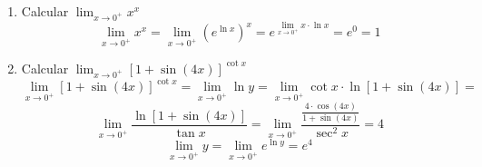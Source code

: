 \begin{enumerate}
	\item Calcular $\lim_{x\rightarrow0^{+}}x^x$
		$$\lim_{x\rightarrow0^+}x^x=\lim_{x\rightarrow0^{+}}(e^{\ln x})^x=e^{\lim_{x\rightarrow0^+}x\cdot\ln x}=e^0=1$$
	\item Calcular $\lim_{x\rightarrow0^{+}}[1+\sin(4x)]^{\cot x}$
		$$\lim_{x\rightarrow0^+}[1+\sin(4x)]^{\cot x}=\lim_{x\rightarrow0^+}\ln y=\lim_{x\rightarrow0^+}\cot x\cdot\ln [1+\sin(4x)]=$$
		$$\lim_{x\rightarrow0^+}\frac{\ln [1+\sin(4x)]}{\tan x}=\lim_{x\rightarrow0^+}\frac{\displaystyle\frac{4\cdot\cos(4x)}{1+\sin(4x)}}{\sec^2 x}=4$$
		$$\lim_{x\rightarrow0^+}y=\lim_{x\rightarrow 0^+}e^{\ln y}=e^4$$
\end{enumerate}